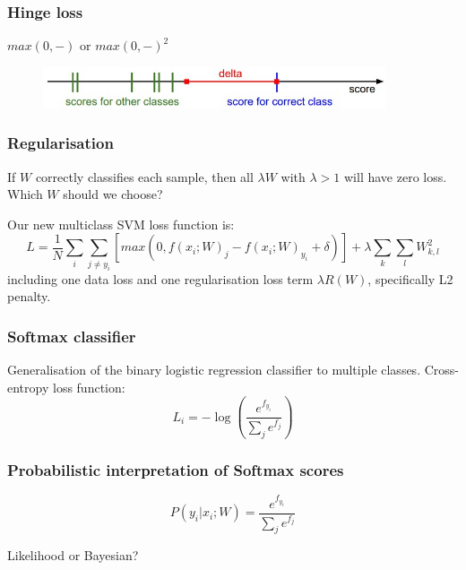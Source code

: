\begin{frame}
        \frametitle{Hinge loss}

	$max(0,-)$ or $max(0,-)^2$

	\centering
	\begin{figure}
      		\includegraphics[width=0.9\textwidth]{Pics/margin.jpg}
     	\end{figure}
 
\end{frame}

\begin{frame}
	\frametitle{Regularisation}

	If $W$ correctly classifies each sample, then all $\lambda W$ with $\lambda>1$ will have zero loss.\\
	\vskip 0.2cm
	Which $W$ should we choose?

	\vskip 0.5cm

	\pause
	
	Our new multiclass SVM loss function is:
	\begin{equation*}
                L = \frac{1}{N} \sum_i \sum_{j \neq y_i} [max (0, f(x_i; W)_j - f(x_i; W)_{y_i} + \delta)] + \lambda \sum_k \sum_l W^2_{k,l}
        \end{equation*}
	including one data loss and one regularisation loss term $\lambda R(W)$, specifically L2 penalty.

\end{frame}

\begin{frame}
	\frametitle{Softmax classifier}

	Generalisation of the binary logistic regression classifier to multiple classes.
	\vskip 0.5cm
	Cross-entropy loss function:
	\begin{equation}
		L_i = -\log ( \frac{ e^{f_{y_i}}} {\sum_j e^{f_j}} )
	\end{equation}
	
\end{frame}

\begin{frame}
	\frametitle{Probabilistic interpretation of Softmax scores}

	\begin{equation}
      		P(y_i | x_i; W) = \frac{ e^{f_{y_i}}} {\sum_j e^{f_j}}
        \end{equation}

	Likelihood or Bayesian?

\end{frame}

